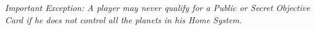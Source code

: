 \documentclass[11pt,fleqn]{book} %
\begin{document}
\emph{Important Exception: A player may never qualify for a Public or Secret Objective Card if he does not control all the planets in his Home System.}






\end{document}
